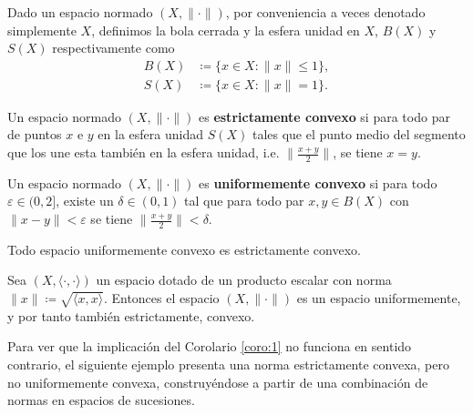 Dado un espacio normado $ (X, \| \cdot \|) $, por conveniencia a veces denotado simplemente $ X $, definimos la bola cerrada y la esfera unidad en $ X $, $ B(X) $ y $ S(X) $ respectivamente como
\begin{equation}
\begin{split}
    B(X) &\coloneq \{x \in X \colon \| x \| \leq 1 \}, \\
    S(X) &\coloneq \{x \in X \colon \| x \| = 1 \}.
\end{split}
\end{equation}

\begin{definition}
    Un espacio normado $ (X, \| \cdot \|) $ es {\bf estrictamente convexo} si para todo par de puntos $ x $ e $ y $ en la esfera unidad $ S(X) $ tales que el punto medio del segmento que los une esta también en la esfera unidad, i.e. $\| \frac{x+y}{2}\| $, se tiene $ x = y $.
\end{definition}

\begin{definition}
    Un espacio normado $ (X, \| \cdot \|) $ es {\bf uniformemente convexo} si para todo $ \varepsilon \in (0, 2] $, existe un $ \delta \in (0, 1) $ tal que para todo par $ x, y \in B(X) $ con $ \| x - y \| < \varepsilon $ se tiene $ \| \frac{x+y}{2} \| < \delta $.
\end{definition}

\begin{corollary} \label{coro:1}
    Todo espacio uniformemente convexo es estrictamente convexo.
\end{corollary}

\begin{proposition} \label{prop:hilbert-convex}
    Sea $ (X, \langle \cdot, \cdot \rangle) $ un espacio dotado de un producto escalar con norma $ \|x\| \coloneq \sqrt{\langle x, x \rangle} $. Entonces el espacio $ (X, \|\cdot\|) $ es un espacio uniformemente, y por tanto también estrictamente, convexo. 
\end{proposition}

Para ver que la implicación del Corolario \ref{coro:1} no funciona en sentido contrario, el siguiente ejemplo presenta una norma estrictamente convexa, pero no uniformemente convexa, construyéndose a partir de una combinación de normas en espacios de sucesiones.

